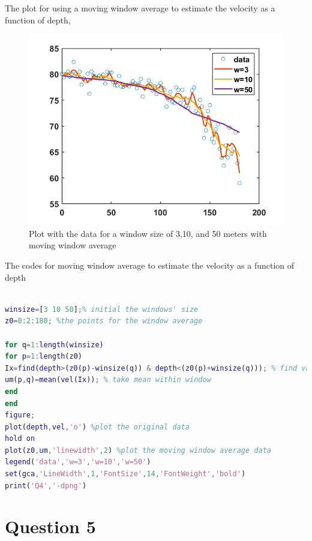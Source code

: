 \documentclass[
	12pt, %
]{fphw}
\begin{document}
The plot for using a moving window average to estimate the velocity as a function of depth,

\begin{figure}[htbp]
	\centering
	\includegraphics[width=0.8\columnwidth]{Q4.png} 
	\caption{Plot with the data for a
		window size of 3,10, and 50 meters with moving window average}
\end{figure}


The codes for  moving window average to estimate the velocity as a function of depth

\begin{lstlisting}[language=Matlab,escapeinside=``]

winsize=[3 10 50];% initial the windows' size
z0=0:2:180; %the points for the window average

for q=1:length(winsize)
for p=1:length(z0)
Ix=find(depth>(z0(p)-winsize(q)) & depth<(z0(p)+winsize(q))); % find values within window
um(p,q)=mean(vel(Ix)); % take mean within window
end
end
figure; 
plot(depth,vel,'o') %plot the original data
hold on
plot(z0,um,'linewidth',2) %plot the moving window average data
legend('data','w=3','w=10','w=50')
set(gca,'LineWidth',1,'FontSize',14,'FontWeight','bold')
print('Q4','-dpng')

\end{lstlisting}






\section*{Question 5 }
\end{document}
